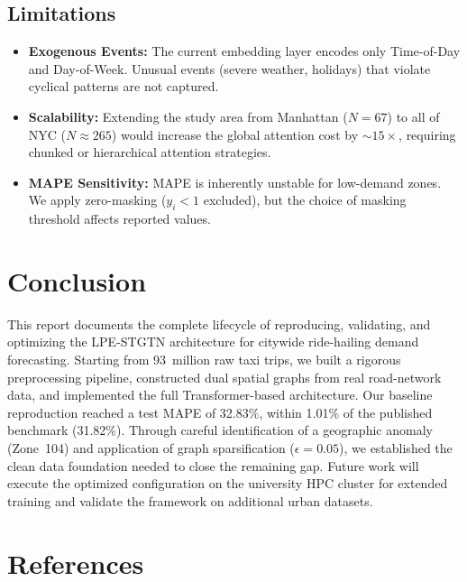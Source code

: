 \documentclass{rapportECL}
\begin{document}
\subsection{Limitations}
\begin{itemize}[leftmargin=*]
    \item \textbf{Exogenous Events:} The current embedding layer encodes only Time-of-Day and Day-of-Week. Unusual events (severe weather, holidays) that violate cyclical patterns are not captured.
    \item \textbf{Scalability:} Extending the study area from Manhattan ($N{=}67$) to all of NYC ($N{\approx}265$) would increase the global attention cost by ${\sim}15\times$, requiring chunked or hierarchical attention strategies.
    \item \textbf{MAPE Sensitivity:} MAPE is inherently unstable for low-demand zones. We apply zero-masking ($y_i < 1$ excluded), but the choice of masking threshold affects reported values.
\end{itemize}

\section{Conclusion}

This report documents the complete lifecycle of reproducing, validating, and optimizing the LPE-STGTN architecture for citywide ride-hailing demand forecasting. Starting from 93~million raw taxi trips, we built a rigorous preprocessing pipeline, constructed dual spatial graphs from real road-network data, and implemented the full Transformer-based architecture. Our baseline reproduction reached a test MAPE of 32.83\%, within 1.01\% of the published benchmark (31.82\%). Through careful identification of a geographic anomaly (Zone~104) and application of graph sparsification ($\epsilon{=}0.05$), we established the clean data foundation needed to close the remaining gap. Future work will execute the optimized configuration on the university HPC cluster for extended training and validate the framework on additional urban datasets.

\section*{References}
\end{document}
